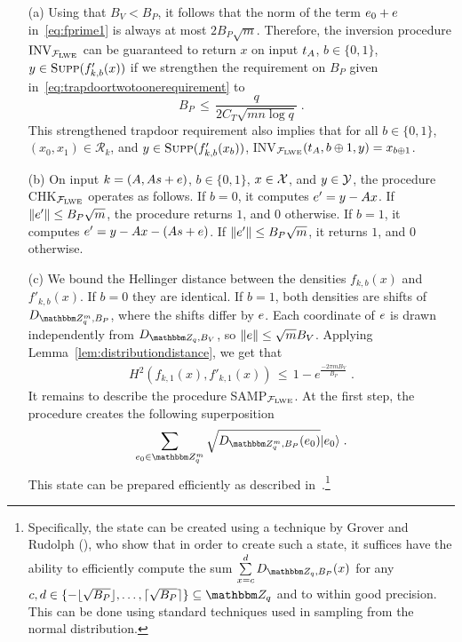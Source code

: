 \begin{enumerate}
\item[(a)] Using that $B_V < B_P$, it follows that the norm of the term $\*e_0 + \*e$ in~\eqref{eq:fprime1} is always at most $2B_P\sqrt{m}$. Therefore, the inversion procedure $\textrm{INV}_{\mathcal{F}_{\mathrm{LWE}}}$ can be guaranteed to return $x$ on input $t_{\*A}$, $b\in \{0,1\}$, $y\in \textsc{Supp}(f'_{k,b}(x))$ if we strengthen the requirement on $B_P$ given in~\eqref{eq:trapdoortwotoonerequirement} to
\begin{equation}\label{eq:superpositiontrapdoorrequirement}
    B_P \,\leq\, \frac{q}{2C_T\sqrt{mn\log q}}\;.
\end{equation}
This strengthened trapdoor requirement also implies that for all $b\in \{0,1\}$, $(x_0,x_1)\in\mathcal{R}_k$, and $y\in \textsc{Supp}(f'_{k,b}(x_b))$, INV$_{\mathcal{F}_{\lwe}}(t_{\*A},b\oplus 1,y) = x_{b\oplus 1}$. 
\item[(b)] On input $k = (\*A,\*A\*s + \*e)$, $b\in\{0,1\}$, $x \in \mathcal{X}$, and $y\in\mathcal{Y}$, the procedure CHK$_{\mathcal{F}_{\mathrm{LWE}}}$ operates as follows. If $b=0$, it computes $\*e' = y - \*Ax$. If $\|\*e'\| \leq B_P\sqrt{m}$, the procedure returns $1$, and $0$ otherwise. If $b = 1$, it computes $\*e' = y - \*Ax - (\*A\*s + \*e)$. If $\|\*e'\| \leq B_P\sqrt{m}$, it returns $1$, and $0$ otherwise. 

\item[(c)] 
We bound the Hellinger distance between the densities $f_{k,b}(x)$ and $f'_{k,b}(x)$. If $b=0$ they are identical. If $b=1$, both densities are shifts of $D_{\mZ_q^m,B_P}$, where the shifts differ by $\*e$. Each coordinate of $\*e$ is drawn independently from $D_{\mZ_q,B_V}$, so $\|\*e\|\leq \sqrt{m}B_V$. Applying Lemma~\ref{lem:distributiondistance}, we get that 
\begin{eqnarray*}
H^2(f_{k,1}(x),f'_{k,1}(x))\,\leq \, 1 - e^{\frac{-2\pi mB_V}{B_P}}\;.
\end{eqnarray*}
It remains to describe the  procedure SAMP$_{\mathcal{F}_{\mathrm{LWE}}}$. At the first step, the procedure creates the following superposition
\begin{equation}\label{eq:discretesup}
\sum_{\*e_0\in \mZ_q^m} \sqrt{D_{\mZ_q^m,B_P}(\*e_0)}\ket{\*e_0}\;.
\end{equation}
This state can be prepared efficiently as described in~\cite[Lemma 3.12]{regev2005}.\footnote{Specifically, the state can be created using a technique by Grover and Rudolph (\cite{distributionsuperpositions}), who show that in order to create such a state, it suffices have the ability to efficiently compute the sum $\sum\limits_{x=c}^d D_{\mZ_q,B_P}(x)$  for any $c,d\in\{-\lfloor\sqrt{B_P}\rfloor,\ldots,\lceil\sqrt{B_P}\rceil\}\subseteq \mZ_q$  and to within good precision. This can be done using standard techniques used in sampling from the normal distribution.}


\end{enumerate}
